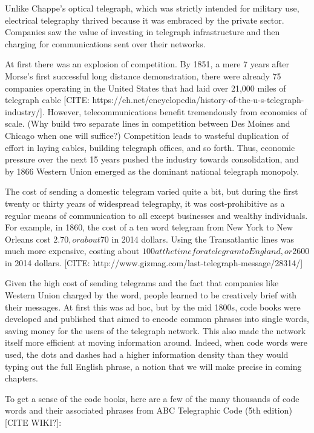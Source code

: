 \documentclass[UTF8]{book}
\begin{document}
\begin{CJK}{UTF8}{gbsn}
Unlike Chappe's optical telegraph, which was strictly intended for military use, electrical telegraphy thrived because it was embraced by the private sector. Companies saw the value of investing in telegraph infrastructure and then charging for communications sent over their networks.

At first there was an explosion of competition. By 1851, a mere 7 years after Morse's first successful long distance demonstration, there were already 75 companies operating in the United States that had laid over 21,000 miles of telegraph cable [CITE: https://eh.net/encyclopedia/history-of-the-u-s-telegraph-industry/]. However, telecommunications benefit tremendously from economies of scale. (Why build two separate lines in competition between Des Moines and Chicago when one will suffice?) Competition leads to wasteful duplication of effort in laying cables, building telegraph offices, and so forth. Thus, economic pressure over the next 15 years pushed the industry towards consolidation, and by 1866 Western Union emerged as the dominant national telegraph monopoly.

The cost of sending a domestic telegram varied quite a bit, but during the first twenty or thirty years of widespread telegraphy, it was cost-prohibitive as a regular means of communication to all except businesses and wealthy individuals. For example, in 1860, the cost of a ten word telegram from New York to New Orleans cost $2.70, or about $70 in 2014 dollars. Using the Transatlantic lines was much more expensive, costing about $100 at the time for a telegram to England, or $2600 in 2014 dollars. [CITE: http://www.gizmag.com/last-telegraph-message/28314/]

Given the high cost of sending telegrams and the fact that companies like Western Union charged by the word, people learned to be creatively brief with their messages. At first this was ad hoc, but by the mid 1800s, code books were developed and published that aimed to encode common phrases into single words, saving money for the users of the telegraph network. This also made the network itself more efficient at moving information around. Indeed, when code words were used, the dots and dashes had a higher information density than they would typing out the full English phrase, a notion that we will make precise in coming chapters.

To get a sense of the code books, here are a few of the many thousands of code words and their associated phrases from ABC Telegraphic Code (5th edition) [CITE WIKI?]:


\end{CJK}
\end{document}
